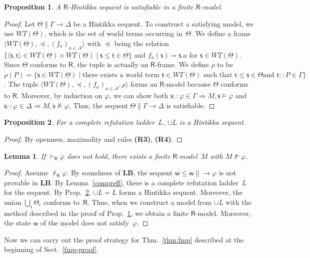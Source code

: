 \documentclass[doctor]{iscs-thesis}
\newcommand{\agents}{\mathcal A}
\newcommand{\tuple}[1]{\langle{#1}\rangle}
\newcommand{\vdashR}{\vdash_{\mathsf R}}
\newtheorem{proposition}{Proposition}
\newtheorem{lemma}{Lemma}
\newcommand{\LB}{\textbf{LB}}
\begin{document}
\begin{proposition}
 \label{Hsat}
 A $\mathsf R$-Hintikka sequent is satisfiable in a finite $\mathsf R$-model.
\end{proposition}
\begin{proof}
 \newcommand{\W}{WT(\Theta)}
 Let $\Theta\parallel \Gamma\longrightarrow\Delta$ be a Hintikka sequent.
 To construct a satisfying model, we use $\W$,
 which is the set of world
 terms occurring in~$\Theta$.
 We define a frame $\tuple{\W, \preceq, (f_a)_{a\in\agents}}$ with
 $\preceq$ being the relation $\{\tuple{\mathsf s,\mathsf t}\in
 \W\times \W\mid
 \mathsf s\le
 \mathsf t\in\Theta\}$ and
 $f_a(\mathsf s) = \mathsf s.a$ for $\mathsf s\in\W$\enspace.
 Since $\Theta$ conforms to $\mathsf R$, 
 the tuple is actually an $\mathsf R$-frame.
 We define $\rho$ to be $\rho(P) = 
 \{\mathsf s\in \W\mid
 \mbox{there exists a world term } \mathsf t \in \W \mbox{ such that }
 \mathsf t\le
 \mathsf s \in \Theta\mbox{
 and }\mathsf t::P\in \Gamma\}$.
 The tuple $\tuple{\W,\preceq,(f_a)_{a\in \agents},\rho}$ forms
 an $\mathsf R$-model because $\Theta$ conforms to $\mathsf R$.
 Moreover, by induction on $\varphi$, we can show both 
 $\mathsf s::\varphi\in\Gamma\Longrightarrow M,\mathsf s\models\varphi$
 and 
 $\mathsf s::\varphi\in\Delta\Longrightarrow M,\mathsf s\not\models\varphi$.
 Thus, the sequent $\Theta\parallel \Gamma\longrightarrow\Delta$ is satisfiable.
\end{proof}

\begin{proposition}
\label{completehintikka}
 For a complete refutation ladder~$L$,
$\cup L$ is a Hintikka sequent.
\end{proposition}
\begin{proof}
 By openness, maximality and rules \textbf{(R3)}, \textbf{(R4)}.
\end{proof}

\begin{lemma}
\label{R-fmp}
 If $\vdashR\varphi$  does not hold, there exists a finite $\mathsf
 R$-model~$M$ with $M\not\models\varphi$.
\end{lemma}
\begin{proof}
 Assume $\not\vdashR\varphi$.
 By soundness of \LB,
 the sequent $\mathsf w\le\mathsf w\parallel \longrightarrow\varphi$ is not
 provable in \LB.
 By Lemma~\ref{comprefl},
 there is a complete refutation ladder~$L$ for the sequent.
 By Prop.~\ref{completehintikka},
 $\cup L = L$  forms a Hintikka
 sequent.
 Moreover, 
 the union $\bigcup_i\Theta_i$ conforms to~$\mathsf
 R$.
 Thus, when we construct a model from $\cup L$ with the method described in
 the proof of Prop.~\ref{Hsat},
 we obtain a finite $\mathsf R$-model.
 Moreover, the state $\mathsf w$ of the model does not satisfy~$\varphi$.
\end{proof}
Now we can carry out the proof strategy for Thm.~\ref{thm:fmp} described
at the beginning of Sect.~\ref{fmp-proof}.
\end{document}
